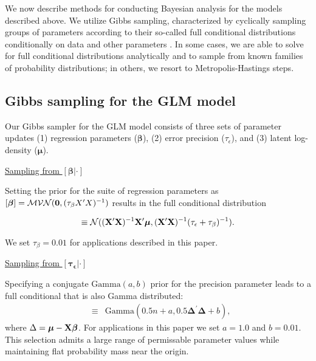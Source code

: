 \documentclass[12pt,fleqn]{article}
\begin{document}
\begin{flushleft}
We now describe methods for conducting Bayesian analysis for the models described above.  We utilize Gibbs sampling, characterized by cyclically sampling groups of parameters according to their so-called full conditional distributions conditionally on data and other parameters \citep{GelmanEtAl2004}.  In some cases, we are able to solve for full conditional distributions analytically and to sample from known families of probability distributions; in others, we resort to Metropolis-Hastings steps.

\subsection{Gibbs sampling for the GLM model}

Our Gibbs sampler for the GLM model consists of three sets of parameter updates (1) regression parameters ($\boldsymbol{\beta}$), (2) error precision ($\tau_\epsilon$), and (3) latent log-density ($\boldsymbol{\mu}$).

\underline{Sampling from $[\boldsymbol{\beta}|\cdot]$}

Setting the prior for the suite of regression parameters as $[\boldsymbol{\beta}] = \mathcal{MVN}({\bf 0},(\tau_\beta X^\prime X)^{-1})$ results in the full conditional distribution
\begin{linenomath*}
\begin{equation*}
   [\boldsymbol{\beta} | \cdot] \equiv \mathcal{N}(({\bf X}^\prime {\bf X})^{-1}{\bf X}^\prime \boldsymbol{\mu},({\bf X}^\prime {\bf X})^{-1} (\tau_\epsilon + \tau_\beta)^{-1}).
\end{equation*}
\end{linenomath*}
We set $\tau_\beta = 0.01$ for applications described in this paper.

\underline{Sampling from $[\boldsymbol{\tau_\epsilon}|\cdot]$}

Specifying a conjugate $\text{Gamma}(a,b)$ prior for the precision parameter leads to a full conditional that is also Gamma distributed:
\begin{eqnarray}
  [\tau_\epsilon | \cdot] & \equiv & \textrm{Gamma}(0.5n + a,0.5 \boldsymbol{\Delta}^\prime \boldsymbol{\Delta} +b),
  \label{eq:tau_eps}
\end{eqnarray}
where $\Delta = \boldsymbol{\mu}-{\bf X}\boldsymbol{\beta}$.  For applications in this paper we set $a=1.0$ and $b=0.01$.  This selection admits a large range of permissable parameter values while maintaining flat probability mass near the origin.


\end{flushleft}
\end{document}
